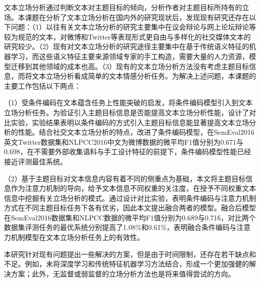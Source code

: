 

文本立场分析通过判断文本对主题目标的倾向，分析作者对主题目标所持有的立场。本课题在分析了文本立场分析在国内外的研究现状后，发现现有研究还存在以下问题：（1）以往有关文本立场分析的研究主要集中在议会辩论与网上论坛辩论等较为规范的文本，对微博和Twitter等表现形式更自由与多样化的社交媒体文本的研究较少。（2）现有对文本立场分析的研究途径主要集中在基于传统语义特征的机器学习，而这些语义特征主要来源领域专家的手工构造，需要大量的人力资源，模型迁移到其他领域的成本也高。（3）现有的文本立场分析方法没有考虑主题目标信息，而将文本立场分析看成简单的文本情感分析任务。为解决上述问题，本课题的主要工作包括以下两点：

（1）受条件编码在文本蕴含任务上性能突破的启发，将条件编码模型引入到文本立场分析任务。为验证引入主题目标信息是否能提高文本立场分析性能，设计了对比实验，实验结果表明以条件编码的方式引入主题目标信息能显著提高文本立场分析的性能。结合社交文本立场分析的特点，改进了条件编码模型，在SemEval2016英文Twitter数据集和NLPCC2016中文为微博数据的微平均F1值分别为0.671与0.698，在不需要外部收集语料与手工设计特征的前提下，条件编码模型性能已经接近评测最佳系统。

（2）基于主题目标对文本信息内容有着不同的侧重点为基础，本文将主题目标信息作为注意力机制的导向，给予文本信息不同权重的关注度，在授予不同权重文本信息中挖掘有关立场分析的模式。通过设计对比实验，表明条件编码与注意力机制方式在不同主题目标任务下各有优劣，因此本文提出融合两者的模型。融合后模型在SemEval2016数据集和NLPCC数据的微平均F1值分别为0.689与0.716，对比两个数据集评测任务的最优系统分别提高了1.08\%和0.61\%，表明融合条件编码与注意力机制模型在文本立场分析任务上的有效性。

本研究针对现有问题提出一些解决的方案，但是由于时间限制，还存在若干缺点和不足。例如，未将深度学习和传统特征机器学习方法结合，形成一个更加强健的解决方案；此外，无监督或弱监督的立场分析方法也是将来值得尝试的方向。